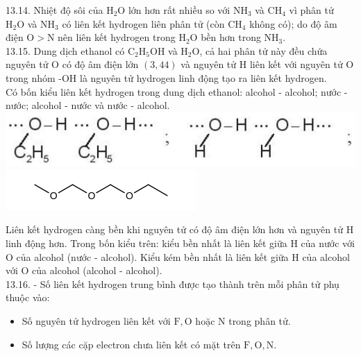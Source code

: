 \documentclass[10pt]{article}
\begin{document}
13.14. Nhiệt độ sôi của $\mathrm{H}_{2} \mathrm{O}$ lớn hơn rất nhiều so với $\mathrm{NH}_{3}$ và $\mathrm{CH}_{4}$ vì phân tử $\mathrm{H}_{2} \mathrm{O}$ và $\mathrm{NH}_{3}$ có liên kết hydrogen liên phân tử (còn $\mathrm{CH}_{4}$ không có); do độ âm điện $\mathrm{O}>\mathrm{N}$ nên liên kết hydrogen trong $\mathrm{H}_{2} \mathrm{O}$ bền hơn trong $\mathrm{NH}_{3}$.\\
13.15. Dung dịch ethanol có $\mathrm{C}_{2} \mathrm{H}_{5} \mathrm{OH}$ và $\mathrm{H}_{2} \mathrm{O}$, cả hai phân tử này đều chứa nguyên tử O có độ âm điện lớn $(3,44)$ và nguyên tử H liên kết với nguyên tử O trong nhóm -OH là nguyên tử hydrogen linh động tạo ra liên kết hydrogen.\\
Có bốn kiểu liên kết hydrogen trong dung dịch ethanol: alcohol - alcohol; nước - nước; alcohol - nước và nước - alcohol.\\
\includegraphics[max width=\textwidth, center]{2025_10_23_ee735750217b2aca435cg-28}\\
\includegraphics{smile-c1976842053c97f21ba23c5514c7c9ee39bcbcee}

Liên kết hydrogen càng bền khi nguyên tử có độ âm điện lớn hơn và nguyên tử H linh động hơn. Trong bốn kiểu trên: kiểu bền nhất là liên kết giữa H của nước với O của alcohol (nước - alcohol). Kiểu kém bền nhất là liên kết giữa H của alcohol với O của alcohol (alcohol - alcohol).\\
13.16. - Số liên kết hydrogen trung bình được tạo thành trên mỗi phân tử phụ thuộc vào:

\begin{itemize}
  \item Số nguyên tử hydrogen liên kết với $\mathrm{F}, \mathrm{O}$ hoặc N trong phân tử.
  \item Số lượng các cặp electron chưa liên kết có mặt trên $\mathrm{F}, \mathrm{O}, \mathrm{N}$.
\end{itemize}
\end{document}
